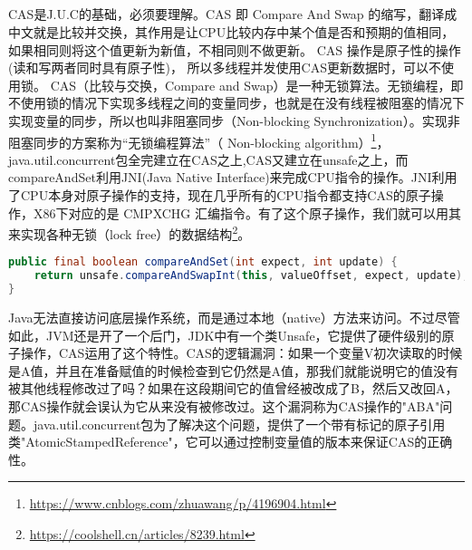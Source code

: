 \documentclass[../../../interview-questions.tex]{subfiles}
\begin{document}
\subsection{\color{red}{Java CAS原理}}

CAS是J.U.C的基础，必须要理解。CAS 即 Compare And Swap 的缩写，翻译成中文就是比较并交换，其作用是让CPU比较内存中某个值是否和预期的值相同，如果相同则将这个值更新为新值，不相同则不做更新。 CAS 操作是原子性的操作(读和写两者同时具有原子性)， 所以多线程并发使用CAS更新数据时，可以不使用锁。
CAS（比较与交换，Compare and Swap）是一种无锁算法。无锁编程，即不使用锁的情况下实现多线程之间的变量同步，也就是在没有线程被阻塞的情况下实现变量的同步，所以也叫非阻塞同步（Non-blocking Synchronization）。实现非阻塞同步的方案称为“无锁编程算法”（ Non-blocking algorithm）\footnote{\url{https://www.cnblogs.com/zhuawang/p/4196904.html}}，java.util.concurrent包全完建立在CAS之上,CAS又建立在unsafe之上，而compareAndSet利用JNI(Java Native Interface)来完成CPU指令的操作。JNI利用了CPU本身对原子操作的支持，现在几乎所有的CPU指令都支持CAS的原子操作，X86下对应的是 CMPXCHG 汇编指令。有了这个原子操作，我们就可以用其来实现各种无锁（lock free）的数据结构\footnote{\url{https://coolshell.cn/articles/8239.html}}。

\begin{lstlisting}[language=Java]
public final boolean compareAndSet(int expect, int update) {
    return unsafe.compareAndSwapInt(this, valueOffset, expect, update);
}
\end{lstlisting}

Java无法直接访问底层操作系统，而是通过本地（native）方法来访问。不过尽管如此，JVM还是开了一个后门，JDK中有一个类Unsafe，它提供了硬件级别的原子操作，CAS运用了这个特性。CAS的逻辑漏洞：如果一个变量V初次读取的时候是A值，并且在准备赋值的时候检查到它仍然是A值，那我们就能说明它的值没有被其他线程修改过了吗？如果在这段期间它的值曾经被改成了B，然后又改回A，那CAS操作就会误认为它从来没有被修改过。这个漏洞称为CAS操作的"ABA"问题。java.util.concurrent包为了解决这个问题，提供了一个带有标记的原子引用类"AtomicStampedReference"，它可以通过控制变量值的版本来保证CAS的正确性。
\end{document}
